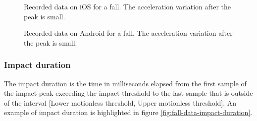 \documentclass[12pt, a4paper, onecolumn]{article}
\begin{document}
	\begin{figure}[H]
		\centering
		\caption{Recorded data on iOS for a fall. The acceleration variation after the peak is small.}%
		\label{fig:fall-data-fall-ios}%
	\end{figure}
	
	
	\begin{figure}[H]
		\centering
		\caption{Recorded data on Android for a fall. The acceleration variation after the peak is small.}%
		\label{fig:fall-data-fall-android}%
	\end{figure}
	
	
	
	\subsubsection{Impact duration}
	
	The impact duration is the time in milliseconds elapsed from the first sample of the impact peak exceeding the impact threshold to the last sample that is outside of the interval [Lower motionless threshold, Upper motionless threshold]. An example of impact duration is highlighted in figure \ref{fig:fall-data-impact-duration}.
	
\end{document}
